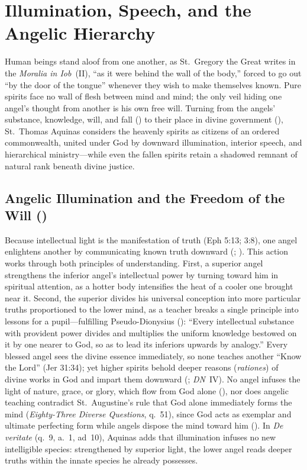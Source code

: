 \section{Illumination, Speech, and the Angelic Hierarchy}

Human beings stand aloof from one another, as St.~Gregory the Great writes in the \emph{Moralia in Iob}~(II), ``as it were behind the wall of the body,'' forced to go out ``by the door of the tongue'' whenever they wish to make themselves known. Pure spirits face no wall of flesh between mind and mind; the only veil hiding one angel's thought from another is his own free will. Turning from the angels' substance, knowledge, will, and fall () to their place in divine government (), St.~Thomas Aquinas considers the heavenly spirits as citizens of an ordered commonwealth, united under God by downward illumination, interior speech, and hierarchical ministry---while even the fallen spirits retain a shadowed remnant of natural rank beneath divine justice.

\subsection{Angelic Illumination and the Freedom of the Will ()}

Because intellectual light is the manifestation of truth (Eph 5:13; 3:8), one angel enlightens another by communicating known truth downward (; ). This action works through both principles of understanding. First, a superior angel strengthens the inferior angel's intellectual power by turning toward him in spiritual attention, as a hotter body intensifies the heat of a cooler one brought near it. Second, the superior divides his universal conception into more particular truths proportioned to the lower mind, as a teacher breaks a single principle into lessons for a pupil---fulfilling Pseudo-Dionysius (): ``Every intellectual substance with provident power divides and multiplies the uniform knowledge bestowed on it by one nearer to God, so as to lead its inferiors upwards by analogy.'' Every blessed angel sees the divine essence immediately, so none teaches another ``Know the Lord'' (Jer 31:34); yet higher spirits behold deeper reasons (\emph{rationes}) of divine works in God and impart them downward (; \emph{DN}~IV). No angel infuses the light of nature, grace, or glory, which flow from God alone (), nor does angelic teaching contradict St.~Augustine's rule that God alone immediately forms the mind (\emph{Eighty-Three Diverse Questions}, q.~51), since God acts as exemplar and ultimate perfecting form while angels dispose the mind toward him (). In \emph{De veritate} (q.~9, a.~1, ad~10), Aquinas adds that illumination infuses no new intelligible species: strengthened by superior light, the lower angel reads deeper truths within the innate species he already possesses.

